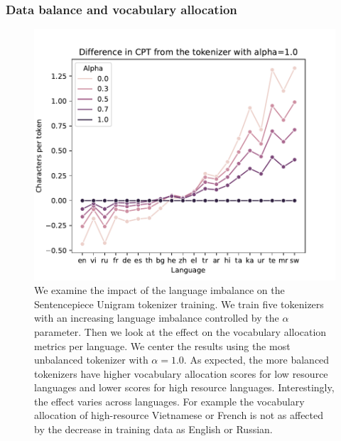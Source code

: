 

\subsubsection{Data balance and vocabulary allocation}

\begin{figure}[H]
    \centering
    \includegraphics[width=\textwidth]{img/results/cpt_vs_alpha.pdf}
    \caption{We examine the impact of the language imbalance on the Sentencepiece Unigram tokenizer training. We train five tokenizers with an increasing language imbalance controlled by the $\alpha$ parameter. Then we look at the effect on the vocabulary allocation metrics per language. We center the results using the most unbalanced tokenizer with $\alpha=1.0$. As expected, the more balanced tokenizers have higher vocabulary allocation scores for low resource languages and lower scores for high resource languages. Interestingly, the effect varies across languages. For example the vocabulary allocation of high-resource Vietnamese or French is not as affected by the decrease in training data as English or Russian. }
    \label{fig:data_balance_vs_allocation_per_lang}
\end{figure}

